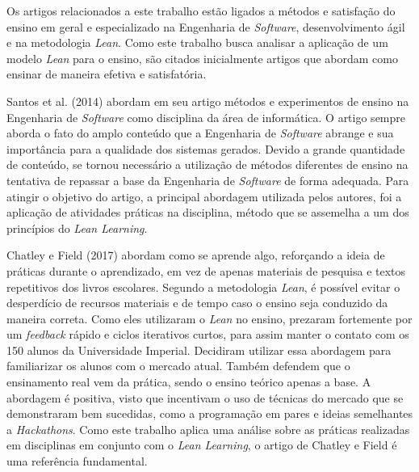 Os artigos relacionados a este trabalho estão ligados a métodos e satisfação do ensino em geral e especializado na Engenharia de \textit{Software}, desenvolvimento ágil e na metodologia \textit{Lean}. Como este trabalho busca analisar a aplicação de um modelo \textit{Lean} para o ensino, são citados inicialmente artigos que abordam como ensinar de maneira efetiva e satisfatória.

\nocite{EnsinoEng2014}Santos et al. (2014) abordam em seu artigo métodos e experimentos de ensino na Engenharia de \textit{Software} como disciplina da área de informática. O artigo sempre aborda o fato do amplo conteúdo que a Engenharia de \textit{Software} abrange e sua importância para a qualidade dos sistemas gerados. Devido a grande quantidade de conteúdo, se tornou necessário a utilização de métodos diferentes de ensino na tentativa de repassar a base da Engenharia de \textit{Software} de forma adequada. Para atingir o objetivo do artigo, a principal abordagem utilizada pelos autores, foi a aplicação de atividades práticas na disciplina, método que se assemelha a um dos princípios do \textit{Lean Learning}.

\nocite{chatley2017lean}Chatley e Field (2017) abordam como se aprende algo, reforçando a ideia de práticas durante o aprendizado, em vez de apenas materiais de pesquisa e textos repetitivos dos livros escolares. Segundo a metodologia \textit{Lean}, é possível evitar o desperdício de recursos materiais e de tempo caso o ensino seja conduzido da maneira correta. Como eles utilizaram o \textit{Lean} no ensino, prezaram fortemente por um \textit{feedback} rápido e ciclos iterativos curtos, para assim manter o contato com os 150 alunos da Universidade Imperial. Decidiram utilizar essa abordagem para familiarizar os alunos com o mercado atual. Também defendem que o ensinamento real vem da prática, sendo o ensino teórico apenas a base. A abordagem é positiva, visto que incentivam o uso de técnicas do mercado que se demonstraram bem sucedidas, como a programação em pares e ideias semelhantes a \textit{Hackathons}. Como este trabalho aplica uma análise sobre as práticas realizadas em disciplinas em conjunto com o \textit{Lean Learning}, o artigo de Chatley e Field é uma referência fundamental.

